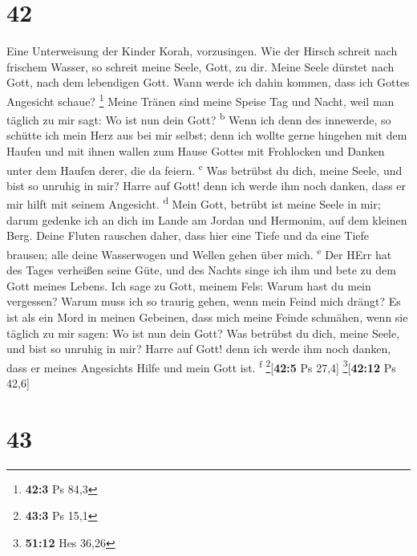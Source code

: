 \hypertarget{section-41}{%
\section{42}\label{section-41}}

 Eine Unterweisung der Kinder Korah, vorzusingen.
 Wie der Hirsch schreit nach frischem Wasser, so schreit
meine Seele, Gott, zu dir.  Meine Seele dürstet nach Gott,
nach dem lebendigen Gott. Wann werde ich dahin kommen, dass ich Gottes
Angesicht schaue? \footnote{\textbf{42:3} Ps 84,3}  Meine
Tränen sind meine Speise Tag und Nacht, weil man täglich zu mir sagt: Wo
ist nun dein Gott? \textsuperscript{b}  Wenn ich denn des
innewerde, so schütte ich mein Herz aus bei mir selbst; denn ich wollte
gerne hingehen mit dem Haufen und mit ihnen wallen zum Hause Gottes mit
Frohlocken und Danken unter dem Haufen derer, die da feiern.
\textsuperscript{c}  Was betrübst du dich, meine Seele,
und bist so unruhig in mir? Harre auf Gott! denn ich werde ihm noch
danken, dass er mir hilft mit seinem Angesicht. \textsuperscript{d}
 Mein Gott, betrübt ist meine Seele in mir; darum gedenke
ich an dich im Lande am Jordan und Hermonim, auf dem kleinen Berg.
 Deine Fluten rauschen daher, dass hier eine Tiefe und da
eine Tiefe brausen; alle deine Wasserwogen und Wellen gehen über mich.
\textsuperscript{e}  Der HErr hat des Tages verheißen
seine Güte, und des Nachts singe ich ihm und bete zu dem Gott meines
Lebens.  Ich sage zu Gott, meinem Fels: Warum hast du
mein vergessen? Warum muss ich so traurig gehen, wenn mein Feind mich
drängt?  Es ist als ein Mord in meinen Gebeinen, dass
mich meine Feinde schmähen, wenn sie täglich zu mir sagen: Wo ist nun
dein Gott?  Was betrübst du dich, meine Seele, und bist
so unruhig in mir? Harre auf Gott! denn ich werde ihm noch danken, dass
er meines Angesichts Hilfe und mein Gott ist. \textsuperscript{f}
\footnote{\textbf{43:3} Ps 15,1}{[}\textbf{42:5} Ps 27,4{]}
\footnote{\textbf{51:12} Hes 36,26}{[}\textbf{42:12} Ps 42,6{]}

\hypertarget{section-42}{%
\section{43}\label{section-42}}

